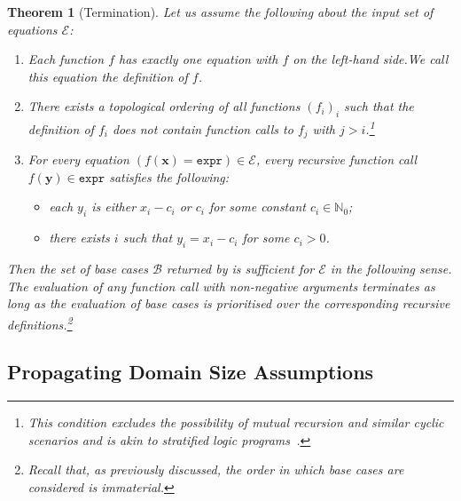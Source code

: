 \documentclass{article}
\newtheorem{theorem}{Theorem}
\theoremstyle{definition}
\theoremstyle{remark}
\newcommand{\expr}{\mathtt{expr}}
\begin{document}
\begin{theorem}[Termination]\label{thm:halting}
  Let us assume the following about the input set of equations $\mathcal{E}$:
  \begin{enumerate}
    \item Each function $f$ has exactly one equation with $f$ on the left-hand
          side.\@ We call this equation the \emph{definition} of $f$.
    \item There exists a topological ordering of all functions ${(f_{i})}_{i}$
          such that the definition of $f_{i}$ does not contain function calls to
          $f_{j}$ with $j > i$.\footnote{This condition excludes the possibility
          of mutual recursion and similar cyclic scenarios and is akin to
          stratified logic programs~\cite{DBLP:books/sp/Lloyd87}.}
    \item For every equation $(f(\mathbf{x}) = \expr) \in \mathcal{E}$, every
          recursive function call $f(\mathbf{y}) \in \expr$ satisfies the
          following:
          \begin{itemize}
            \item each $y_{i}$ is either $x_{i} - c_{i}$ or $c_{i}$ for some
                  constant $c_{i} \in \mathbb{N}_{0}$;
            \item there exists $i$ such that $y_{i} = x_{i} - c_{i}$ for some
                  $c_{i} > 0$.
          \end{itemize}
  \end{enumerate}
  Then the set of base cases $\mathcal{B}$ returned by
   is \emph{sufficient} for $\mathcal{E}$ in the
  following sense. The evaluation of any function call with non-negative
  arguments terminates as long as the evaluation of base cases is prioritised
  over the corresponding recursive definitions.\footnote{Recall that, as
    previously discussed, the order in which base cases are considered is
    immaterial.}
\end{theorem}

\subsection{Propagating Domain Size Assumptions}\label{sec:simplifying}
\end{document}
